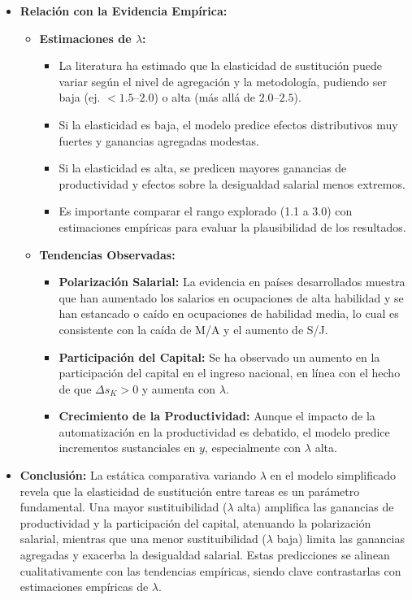 \documentclass{article}
\theoremstyle{remark}
\theoremstyle{definition}
\begin{document}
\begin{enumerate}
\begin{tcolorbox}[title= Soluci\'on 5]
\begin{itemize}
  \item \textbf{Relación con la Evidencia Empírica:}
    \begin{itemize}
      \item \textbf{Estimaciones de \(\lambda\):}
        \begin{itemize}
          \item La literatura ha estimado que la elasticidad de sustitución puede variar según el nivel de agregación y la metodología, pudiendo ser baja (ej. \(< 1.5\text{--}2.0\)) o alta (más allá de \(2.0\text{--}2.5\)).
          \item Si la elasticidad es baja, el modelo predice efectos distributivos muy fuertes y ganancias agregadas modestas.
          \item Si la elasticidad es alta, se predicen mayores ganancias de productividad y efectos sobre la desigualdad salarial menos extremos.
          \item Es importante comparar el rango explorado (1.1 a 3.0) con estimaciones empíricas para evaluar la plausibilidad de los resultados.
        \end{itemize}

        
        
      \item \textbf{Tendencias Observadas:}
        \begin{itemize}
          \item \textbf{Polarización Salarial:} La evidencia en países desarrollados muestra que han aumentado los salarios en ocupaciones de alta habilidad y se han estancado o caído en ocupaciones de habilidad media, lo cual es consistente con la caída de M/A y el aumento de S/J.
          \item \textbf{Participación del Capital:} Se ha observado un aumento en la participación del capital en el ingreso nacional, en línea con el hecho de que \(\Delta s_K > 0\) y aumenta con \(\lambda\).
          \item \textbf{Crecimiento de la Productividad:} Aunque el impacto de la automatizaci\'on en la productividad es debatido, el modelo predice incrementos sustanciales en \(y\), especialmente con \(\lambda\) alta.
        \end{itemize}
    \end{itemize}
    
  \item \textbf{Conclusión:} La estática comparativa variando \(\lambda\) en el modelo simplificado revela que la elasticidad de sustitución entre tareas es un parámetro fundamental. Una mayor sustituibilidad (\(\lambda\) alta) amplifica las ganancias de productividad y la participación del capital, atenuando la polarización salarial, mientras que una menor sustituibilidad (\(\lambda\) baja) limita las ganancias agregadas y exacerba la desigualdad salarial. Estas predicciones se alinean cualitativamente con las tendencias empíricas, siendo clave contrastarlas con estimaciones empíricas de \(\lambda\).
\end{itemize}


\end{tcolorbox}
\end{enumerate}
\end{document}

